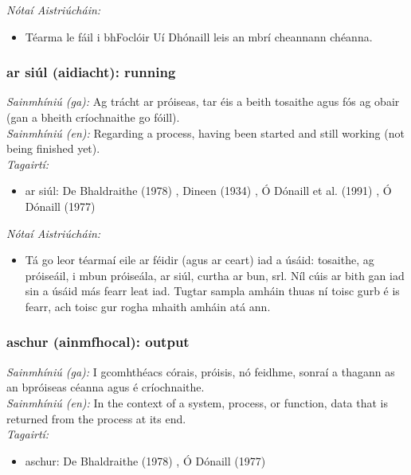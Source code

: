  \noindent \textit{Nótaí Aistriúcháin:}
\begin{itemize}
	\item Téarma le fáil i bhFoclóir Uí Dhónaill leis an mbrí cheannann chéanna.
\end{itemize}


\subsubsection*{ar siúl (aidiacht): running}
 \noindent \textit{Sainmhíniú (ga):} Ag trácht ar próiseas, tar éis a beith tosaithe agus fós ag obair (gan a bheith críochnaithe go fóill).
\\
 \noindent \textit{Sainmhíniú (en):} Regarding a process, having been started and still working (not being finished yet).
\\
 \noindent \textit{Tagairtí:}
\begin{itemize}
	\item ar siúl: De Bhaldraithe (1978) \cite{de-bhaldraithe}, Dineen (1934) \cite{dineen}, Ó Dónaill et al. (1991) \cite{focloir-beag}, Ó Dónaill (1977) \cite{odonaill}
\end{itemize}

 \noindent \textit{Nótaí Aistriúcháin:}
\begin{itemize}
	\item Tá go leor téarmaí eile ar féidir (agus ar ceart) iad a úsáid: tosaithe, ag próiseáil, i mbun próiseála, ar siúl, curtha ar bun, srl. Níl cúis ar bith gan iad sin a úsáid más fearr leat iad. Tugtar sampla amháin thuas ní toisc gurb é is fearr, ach toisc gur rogha mhaith amháin atá ann.
\end{itemize}


\subsubsection*{aschur (ainmfhocal): output}
 \noindent \textit{Sainmhíniú (ga):} I gcomhthéacs córais, próisis, nó feidhme, sonraí a thagann as an bpróiseas céanna agus é críochnaithe.
\\
 \noindent \textit{Sainmhíniú (en):} In the context of a system, process, or function, data that is returned from the process at its end.
\\
 \noindent \textit{Tagairtí:}
\begin{itemize}
	\item aschur: De Bhaldraithe (1978) \cite{de-bhaldraithe}, Ó Dónaill (1977) \cite{odonaill}
\end{itemize}

